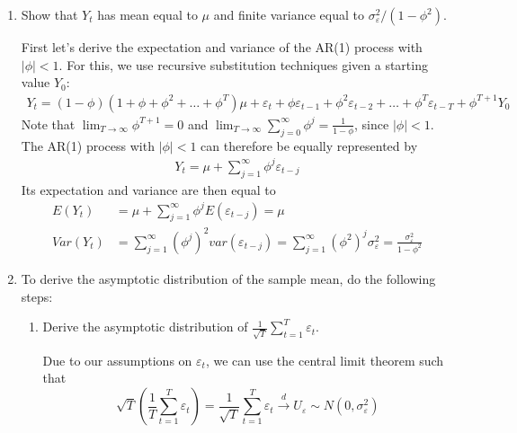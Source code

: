 \begin{enumerate}
\begin{solution}
          \end{solution}
    \item Show that $Y_t$ has mean equal to $\mu $ and finite variance equal to $\sigma_\varepsilon^2/(1-\phi^2)$.
          \begin{solution}
              First let's derive the expectation and variance of the AR(1) process with $|\phi|<1$. For this, we use recursive substitution techniques given a starting value $Y_0$:
              \begin{align*}
                  Y_t = (1-\phi)(1+\phi+\phi^2+\dots+\phi^T)\mu + \varepsilon_t + \phi \varepsilon_{t-1} + \phi^2 \varepsilon_{t-2} + \dots + \phi^T \varepsilon_{t-T} + \phi^{T+1} Y_0
              \end{align*}
              Note that $\lim_{T\rightarrow \infty} \phi^{T+1} = 0$ and $\lim_{T\rightarrow \infty} \sum_{j=0}^\infty \phi^j = \frac{1}{1-\phi}$, since $|\phi|<1$. The AR(1) process with $|\phi|<1$ can therefore be equally represented by
              \begin{align*}
                  Y_t = \mu + \sum_{j=1}^\infty \phi^j \varepsilon_{t-j}
              \end{align*}
              Its expectation and variance are then equal to
              \begin{align*}
                  E(Y_t)   & = \mu + \sum_{j=1}^\infty \phi^j E(\varepsilon_{t-j}) = \mu                                                                                       \\
                  Var(Y_t) & = \sum_{j=1}^\infty (\phi^j)^2 var(\varepsilon_{t-j}) = \sum_{j=1}^\infty (\phi^2)^j \sigma_\varepsilon^2 = \frac{\sigma_\varepsilon^2}{1-\phi^2}
              \end{align*}
          \end{solution}
    \item To derive the asymptotic distribution of the sample mean, do the following steps:
          \begin{enumerate}
              \item Derive the asymptotic distribution of $\frac{1}{\sqrt{T} } \sum_{t=1}^T \varepsilon_t$.
                    \begin{solution}
                        Due to our assumptions on $\varepsilon_t$, we can use the central limit theorem such that
                        \begin{equation*}
                            \sqrt{T} \left(\frac{1}{T} \sum_{t=1}^T \varepsilon_t \right) = \frac{1}{\sqrt{T}} \sum_{t=1}^T \varepsilon_t  \overset{d}{\rightarrow} U_\varepsilon \sim N(0,\sigma_\varepsilon^2)

\end{equation*}
\end{solution}
\end{enumerate}
\end{enumerate}
